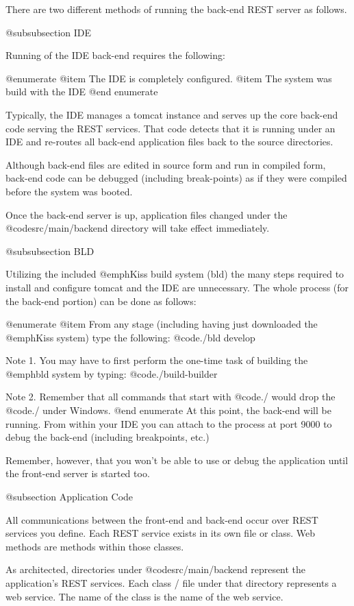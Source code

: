 There are two different methods of running the back-end REST server as
follows.

@subsubsection IDE

Running of the IDE back-end requires the following:

@enumerate
@item
The IDE is completely configured.
@item
The system was build with the IDE
@end enumerate

Typically, the IDE manages a tomcat instance and serves up the core
back-end code serving the REST services.  That code detects that it is
running under an IDE and re-routes all back-end application files back
to the source directories.

Although back-end files are edited in source form and run in compiled
form, back-end code can be debugged (including break-points) as if
they were compiled before the system was booted.

Once the back-end server is up, application files changed under the
@code{src/main/backend} directory will take effect immediately.

@subsubsection BLD

Utilizing the included @emph{Kiss build system (bld)} the many steps required 
to install and configure tomcat and the IDE are unnecessary.  The whole process
(for the back-end portion) can be done as follows:

@enumerate
@item
From any stage (including having just downloaded the @emph{Kiss} system) type
the following:  @code{./bld develop}

Note 1.  You may have to first perform the one-time task of building
the @emph{bld} system by typing: @code{./build-builder}

Note 2.  Remember that all commands that start with @code{./} would drop
the @code{./} under Windows.
@end enumerate
At this point, the back-end will be running.  From within your IDE you
can attach to the process at port 9000 to debug the back-end (including
breakpoints, etc.)

Remember, however, that you won't be able to use or debug the application until
the front-end server is started too.

@subsection Application Code

All communications between the front-end and back-end occur over REST
services you define.  Each REST service exists in its own
file or class.  Web methods are methods within those classes.

As architected, directories under @code{src/main/backend}
represent the application's REST services.  Each class / file under that
directory represents a web service.  The name of the class is the name
of the web service.

